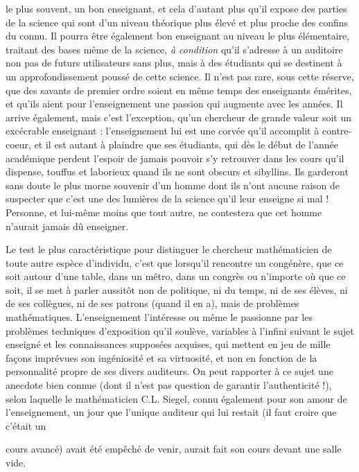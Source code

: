 \documentclass[11pt,a4paper]{article}
\begin{document}
le plus souvent, un bon enseignant, et cela d'autant plus qu'il expose des
parties de la science qui sont d'un niveau théorique plus élevé et plus
proche des confins du connu. Il pourra être également bon enseignant au
niveau le plus élémentaire, traitant des bases même de la science, \emph{à condition}
qu'il s'adresse à un auditoire non pas de futurs utilisateurs sans plus,
mais à des étudiants qui se destinent à un approfondissement poussé de cette
science. Il n'est pas rare, sous cette réserve, que des savants de premier
ordre soient en même temps des enseignants émérites, et qu'ils aient pour
l'enseignement une passion qui augmente avec les années. Il arrive également,
mais c'est l'exception, qu'un chercheur de grande valeur soit un excécrable
enseignant : l'enseignement lui est une corvée qu'il accomplit à contre-coeur,
et il est autant à plaindre que ses étudiants, qui dès le début de l'année
académique perdent l'espoir de jamais pouvoir s'y retrouver dans les cours
qu'il dispense, touffus et laborieux quand ils ne sont obscurs et sibyllins.
Ils garderont sans doute le plus morne souvenir d'un homme dont ils n'ont
aucune raison de suspecter que c'est une des lumières de la science qu'il
leur enseigne si mal ! Personne, et lui-même moins que tout autre, ne
contestera que cet homme n'aurait jamais dû enseigner.

Le test le plus caractéristique pour distinguer le chercheur
mathématicien de toute autre espèce d'individu, c'est que lorsqu'il rencontre
un congénère, que ce soit autour d'une table, dans un métro, dans un congrès
ou n'importe où que ce soit, il se met à parler aussitôt non de politique,
ni du temps, ni de ses élèves, ni de ses collègues, ni de ses patrons (quand
il en a), mais de problèmes mathématiques. L'enseignement l'intéresse ou
même le passionne par les problèmes techniques d'exposition qu'il soulève,
variables à l'infini suivant le sujet enseigné et les connaissances supposées
acquises, qui mettent en jeu de mille façons imprévues son ingéniosité et
sa virtuosité, et non en fonction de la personnalité propre de ses divers
auditeurs. On peut rapporter à ce sujet une anecdote bien connue (dont il
n'est pas question de garantir l'authenticité !), selon laquelle le
mathématicien C.L. Siegel, connu également pour son amour de l'enseignement,
un jour que l'unique auditeur qui lui restait (il faut croire que c'était un

cours avancé) avait été empêché de venir, aurait fait son cours devant une
salle vide.
\end{document}
